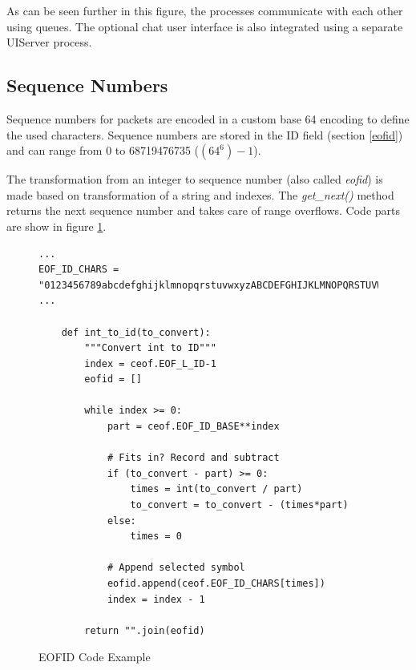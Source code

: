 As can be seen further in this figure, the processes communicate with
each other using queues. The optional chat user interface is also
integrated using a separate UIServer process.
\subsection{Sequence Numbers}
Sequence numbers for packets are encoded in a custom base 64 encoding to
define the used characters. Sequence numbers are stored in the
ID field (section \ref{eofid}) and can range from 0 to 68719476735 ($(64^6)-1$).

The transformation from an integer to sequence 
number (also called \textit{eofid}) is made based on transformation
of a string and indexes. The \textit{get\_next()} method returns
the next sequence number and takes care of range overflows.
Code parts are show in figure \ref{eofidexample}.
\begin{figure}[htbp]
\caption{EOFID Code Example}
\label{eofidexample}
\begin{verbatim}
...
EOF_ID_CHARS = "0123456789abcdefghijklmnopqrstuvwxyzABCDEFGHIJKLMNOPQRSTUVWXYZ-!"
...

    def int_to_id(to_convert):
        """Convert int to ID"""
        index = ceof.EOF_L_ID-1
        eofid = []

        while index >= 0:
            part = ceof.EOF_ID_BASE**index

            # Fits in? Record and subtract
            if (to_convert - part) >= 0:
                times = int(to_convert / part)
                to_convert = to_convert - (times*part)
            else:
                times = 0 

            # Append selected symbol
            eofid.append(ceof.EOF_ID_CHARS[times])
            index = index - 1 

        return "".join(eofid)
\end{verbatim}
\end{figure}
